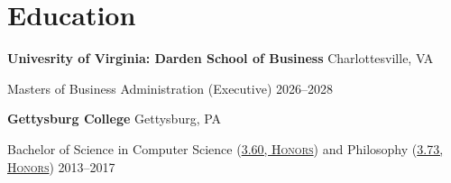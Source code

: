 \documentclass[]{article}
\newcommand\VRule{\color{lightgray}\vrule width 0.5pt}
\begin{document}



\section*{Education}

\textbf{Univesrity of Virginia: Darden School of Business} \hfill Charlottesville, VA

Masters of Business Administration (Executive) \hfill {\footnotesize 2026--2028}

\textbf{Gettysburg College} \hfill Gettysburg, PA

Bachelor of Science in Computer Science {\footnotesize \textsc{(\href{https://www.gettysburg.edu/academic-programs/computer-science/programs/honors-programs}{3.60, Honors})}} and Philosophy {\footnotesize \textsc{(\href{https://web.archive.org/web/20170310055408/https://www.gettysburg.edu/academics/philosophy/awards/}{3.73, Honors})}} \hfill {\footnotesize 2013--2017}
\end{document}
